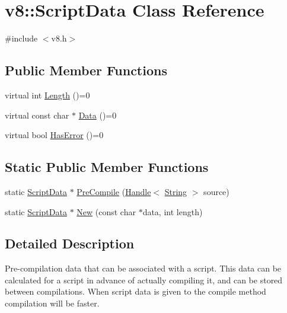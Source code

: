 \hypertarget{classv8_1_1_script_data}{}\section{v8\+:\+:Script\+Data Class Reference}
\label{classv8_1_1_script_data}


{\ttfamily \#include $<$v8.\+h$>$}

\subsection*{Public Member Functions}
\begin{DoxyCompactItemize}
\item 
virtual int \hyperlink{classv8_1_1_script_data_a6aa1007dfe6b09a5e59443bb1afff0b9}{Length} ()=0
\item 
virtual const char $\ast$ \hyperlink{classv8_1_1_script_data_aae01a4e977988fa8338d11d87b572cfa}{Data} ()=0
\item 
virtual bool \hyperlink{classv8_1_1_script_data_ab5cea77b299b7dd73b7024fb114fd7e4}{Has\+Error} ()=0
\end{DoxyCompactItemize}
\subsection*{Static Public Member Functions}
\begin{DoxyCompactItemize}
\item 
static \hyperlink{classv8_1_1_script_data}{Script\+Data} $\ast$ \hyperlink{classv8_1_1_script_data_ad1e46f2a1e84ae151b295f3c74c71787}{Pre\+Compile} (\hyperlink{classv8_1_1_handle}{Handle}$<$ \hyperlink{classv8_1_1_string}{String} $>$ source)
\item 
static \hyperlink{classv8_1_1_script_data}{Script\+Data} $\ast$ \hyperlink{classv8_1_1_script_data_a642fc06a9615387f9ac80f264758cc70}{New} (const char $\ast$data, int length)
\end{DoxyCompactItemize}


\subsection{Detailed Description}
Pre-\/compilation data that can be associated with a script. This data can be calculated for a script in advance of actually compiling it, and can be stored between compilations. When script data is given to the compile method compilation will be faster. 

